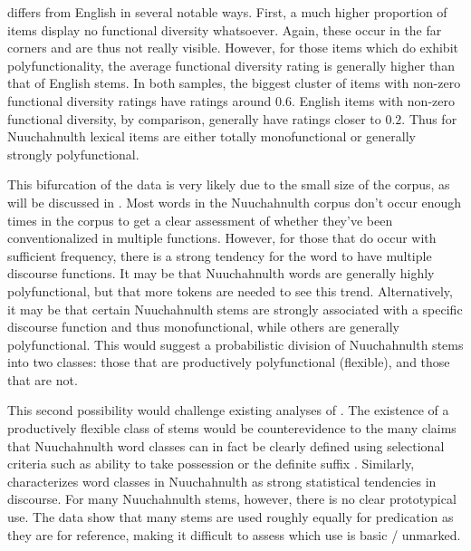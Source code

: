  differs from English in several notable ways. First, a much higher proportion of items display no functional diversity whatsoever. Again, these occur in the far corners and are thus not really visible. However, for those items which do exhibit polyfunctionality, the average functional diversity rating is generally higher than that of English stems. In both samples, the biggest cluster of items with non-zero functional diversity ratings have ratings around $0.6$. English items with non-zero functional diversity, by comparison, generally have ratings closer to $0.2$. Thus for Nuuchahnulth lexical items are either totally monofunctional or generally strongly polyfunctional.

This bifurcation of the data is very likely due to the small size of the  corpus, as will be discussed in . Most words in the Nuuchahnulth corpus don't occur enough times in the corpus to get a clear assessment of whether they've been conventionalized in multiple functions. However, for those that do occur with sufficient frequency, there is a strong tendency for the word to have multiple discourse functions. It may be that Nuuchahnulth words are generally highly polyfunctional, but that more tokens are needed to see this trend. Alternatively, it may be that certain Nuuchahnulth stems are strongly associated with a specific discourse function and thus monofunctional, while others are generally polyfunctional. This would suggest a probabilistic division of Nuuchahnulth stems into two classes: those that are productively polyfunctional (flexible), and those that are not.

This second possibility would challenge existing analyses of . The existence of a productively flexible class of stems would be counterevidence to the many claims that Nuuchahnulth word classes can in fact be clearly defined using selectional criteria such as ability to take possession or the definite suffix \parencites{Jacobsen1979}{DavisGillonMatthewson2014}{Braithwaite2015}. Similarly, \textcite[57]{Nakayama2001} characterizes word classes in Nuuchahnulth as strong statistical tendencies in discourse. For many Nuuchahnulth stems, however, there is no clear prototypical use. The data show that many stems are used roughly equally for predication as they are for reference, making it difficult to assess which use is basic / unmarked.

